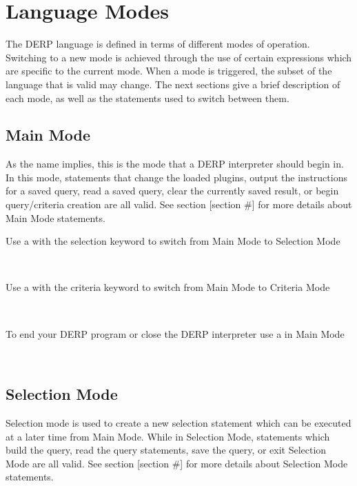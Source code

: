 \section{Language Modes}
The DERP language is defined in terms of different modes of operation. 
Switching to a new mode is achieved through the use of certain expressions 
which are specific to the current mode. When a mode is triggered, the 
subset of the language that is valid may change. The next sections give 
a brief description of each mode, as well as the statements used to switch between them.

\subsection{Main Mode}
As the name implies, this is the mode that a DERP interpreter should begin in. In this mode, 
statements that change the loaded plugins, output the instructions for a saved query, read a 
saved query, clear the currently saved result, or begin query/criteria creation are all valid. 
See section [section #] for more details about Main Mode statements.

Use a  with the selection keyword to switch from Main Mode to Selection Mode
\begin{center}
     \\
\end{center}

Use a  with the criteria keyword to switch from Main Mode to Criteria Mode
\begin{center}
     \\
\end{center}

To end your DERP program or close the DERP interpreter use a  in Main Mode
\begin{center}
     \\
\end{center}

\subsection{Selection Mode}
Selection mode is used to create a new selection statement which can be executed at a later time from Main Mode. 
While in Selection Mode, statements which build the query, read the query statements, save the query, or exit 
Selection Mode are all valid. See section [section #] for more details about Selection Mode statements.

